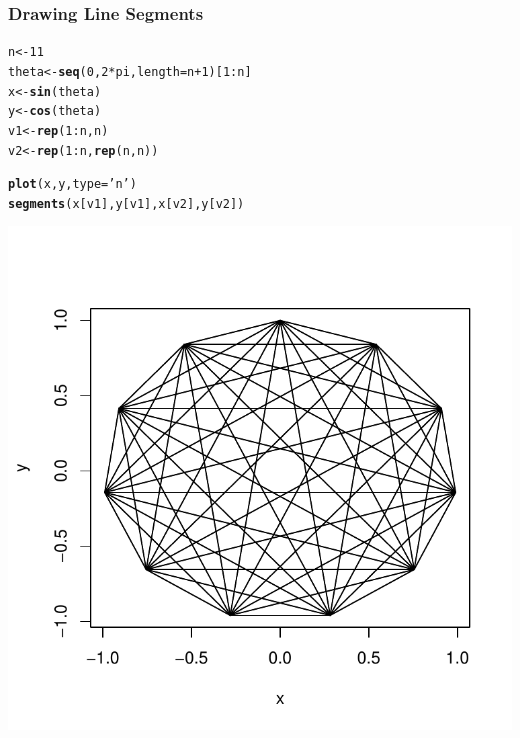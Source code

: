 \documentclass[12pt]{beamer}\usepackage[]{graphicx}\usepackage[]{color}
\makeatletter
\newcommand{\hlnum}[1]{\textcolor[rgb]{0.686,0.059,0.569}{#1}}%
\newcommand{\hlstr}[1]{\textcolor[rgb]{0.192,0.494,0.8}{#1}}%
\newcommand{\hlopt}[1]{\textcolor[rgb]{0,0,0}{#1}}%
\newcommand{\hlstd}[1]{\textcolor[rgb]{0.345,0.345,0.345}{#1}}%
\newcommand{\hlkwb}[1]{\textcolor[rgb]{0.69,0.353,0.396}{#1}}%
\newcommand{\hlkwc}[1]{\textcolor[rgb]{0.333,0.667,0.333}{#1}}%
\newcommand{\hlkwd}[1]{\textcolor[rgb]{0.737,0.353,0.396}{\textbf{#1}}}%
\newenvironment{kframe}{%
 \def\at@end@of@kframe{}%
 \ifinner\ifhmode%
  \def\at@end@of@kframe{\end{minipage}}%
  \begin{minipage}{\columnwidth}%
 \fi\fi%
 \def\FrameCommand##1{\hskip\@totalleftmargin \hskip-\fboxsep
 \colorbox{shadecolor}{##1}\hskip-\fboxsep
     \hskip-\linewidth \hskip-\@totalleftmargin \hskip\columnwidth}%
 \MakeFramed {\advance\hsize-\width
   \@totalleftmargin\z@ \linewidth\hsize
   \@setminipage}}%
 {\par\unskip\endMakeFramed%
 \at@end@of@kframe}
\newenvironment{knitrout}{}{} %
\makeatother
\begin{document}

\begin{frame}[fragile]
\frametitle{Drawing Line Segments}
\begin{knitrout}\footnotesize
{}\color{fgcolor}\begin{kframe}
\begin{alltt}
\hlstd{n} \hlkwb{<-} \hlnum{11}
\hlstd{theta} \hlkwb{<-} \hlkwd{seq}\hlstd{(}\hlnum{0}\hlstd{,} \hlnum{2} \hlopt{*} \hlstd{pi,} \hlkwc{length} \hlstd{= n} \hlopt{+} \hlnum{1}\hlstd{)[}\hlnum{1}\hlopt{:}\hlstd{n]}
\hlstd{x} \hlkwb{<-} \hlkwd{sin}\hlstd{(theta)}
\hlstd{y} \hlkwb{<-} \hlkwd{cos}\hlstd{(theta)}
\hlstd{v1} \hlkwb{<-} \hlkwd{rep}\hlstd{(}\hlnum{1}\hlopt{:}\hlstd{n, n)}
\hlstd{v2} \hlkwb{<-} \hlkwd{rep}\hlstd{(}\hlnum{1}\hlopt{:}\hlstd{n,} \hlkwd{rep}\hlstd{(n, n))}

\hlkwd{plot}\hlstd{(x, y,} \hlkwc{type} \hlstd{=} \hlstr{'n'}\hlstd{)}
\hlkwd{segments}\hlstd{(x[v1], y[v1], x[v2], y[v2])}
\end{alltt}
\end{kframe}
\end{knitrout}
\end{frame}


\begin{frame}[fragile]
\begin{knitrout}\scriptsize
{}\color{fgcolor}

{\centering \includegraphics[width=.8\linewidth,height=.8\linewidth]{figure/segments-1} 

}



\end{knitrout}
\end{frame}
\end{document}
